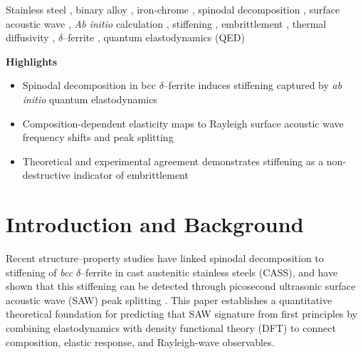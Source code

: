 \documentclass[final,3p,times]{elsarticle}
\begin{document}
\begin{frontmatter}
\begin{abstract}
We investigate spinodal decomposition in \emph{bcc} $\delta$-ferrite in cast austenitic stainless steels by combining experimental measurements with first-principles simulations of \emph{bcc} Fe$_{1-x}$Cr$_x$. Quantum elastodynamic calculations predict surface acoustic wave (SAW) peak splitting arising from elastic stiffening during spinodal decomposition. Agreement between theory and experiment for stiffness and thermal diffusivity establishes SAW peak splitting as a non-destructive indicator of embrittlement. More broadly, the same SAW-based stiffening signature may extend to other embrittlement mechanisms in structural alloys, such as Cu precipitation in reactor pressure vessel (RPV) steels.

\end{abstract}

\begin{keyword}
Stainless steel \sep 
binary alloy \sep
iron-chrome \sep
spinodal decomposition
\sep
surface acoustic wave \sep 
\emph{Ab initio} calculation
\sep
stiffening
\sep
embrittlement
\sep
thermal diffusivity
\sep
$\delta$--ferrite
\sep
quantum elastodynamics (QED)


\end{keyword}

\end{frontmatter}

\textbf{Highlights}

\begin{itemize}
\item Spinodal decomposition in bcc $\delta$--ferrite induces stiffening captured by \emph{ab initio} quantum elastodynamics
\item Composition-dependent elasticity maps to Rayleigh surface acoustic wave frequency shifts and peak splitting
\item Theoretical and experimental agreement demonstrates stiffening as a non-destructive indicator of embrittlement
\end{itemize}


\section{Introduction and Background}
Recent structure--property studies have linked spinodal decomposition to stiffening of \textit{bcc} $\delta$--ferrite in cast austenitic stainless steels (CASS), and have shown that this stiffening can be detected through picosecond ultrasonic surface acoustic wave (SAW) peak splitting \cite{al2023detecting, al2020detecting,al2020non}. 
This paper establishes a quantitative theoretical foundation for predicting that SAW signature from first principles by combining elastodynamics with density functional theory (DFT) to connect composition, elastic response, and Rayleigh-wave observables.
\end{document}
